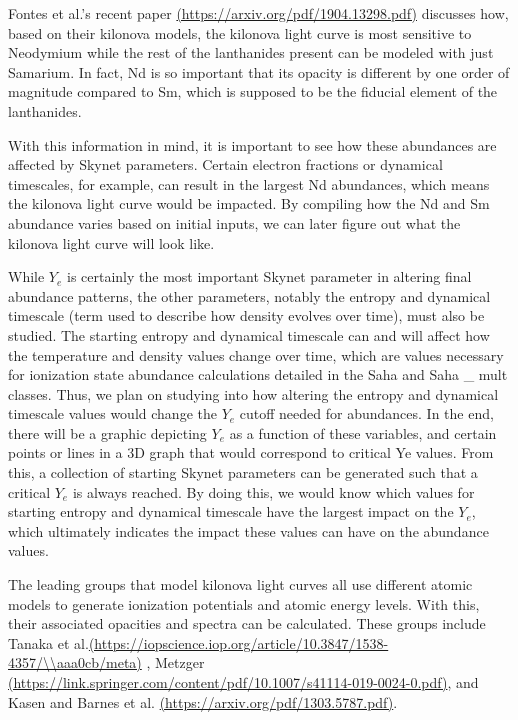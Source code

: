 \documentclass[11pt,a4paper]{article}
\begin{document}
Fontes et al.'s recent paper \url{(https://arxiv.org/pdf/1904.13298.pdf)} discusses how, based on their kilonova models, the kilonova light curve is most sensitive to Neodymium while the rest of the lanthanides present can be modeled with just Samarium. In fact, Nd is so important that its opacity is different by one order of magnitude compared to Sm, which is supposed to be the fiducial element of the lanthanides. 

With this information in mind, it is important to see how these abundances are affected by Skynet parameters. Certain electron fractions or dynamical timescales, for example, can result in the largest Nd abundances, which means the kilonova light curve would be impacted. By compiling how the Nd and Sm abundance varies based on initial inputs, we can later figure out what the kilonova light curve will look like. 

While $Y_e$ is certainly the most important Skynet parameter in altering final abundance patterns, the other parameters, notably the entropy and dynamical timescale (term used to describe how density evolves over time), must also be studied. The starting entropy and dynamical timescale can and will affect how the temperature and density values change over time, which are values necessary for ionization state abundance calculations detailed in the Saha and Saha \_ mult classes. 
Thus, we plan on studying into how altering the entropy and dynamical timescale values would change the $Y_e$ cutoff needed for abundances. In the end, there will be a graphic depicting $Y_e$ as a function of these variables, and certain points or lines in a 3D graph that would correspond to critical Ye values. From this, a collection of starting Skynet parameters can be generated such that a critical $Y_e$ is always reached. By doing this, we would know which values for starting entropy and dynamical timescale have the largest impact on the $Y_e$, which ultimately indicates the impact these values can have on the abundance values. 

The leading groups that model kilonova light curves all use different atomic models to generate ionization potentials and atomic energy levels. With this, their associated opacities and spectra can be calculated.  These groups include Tanaka et al.\url{(https://iopscience.iop.org/article/10.3847/1538-4357/\\aaa0cb/meta)} , Metzger \url{(https://link.springer.com/content/pdf/10.1007/s41114-019-0024-0.pdf)}, and Kasen and Barnes et al. \url{(https://arxiv.org/pdf/1303.5787.pdf)}. 
\end{document}

